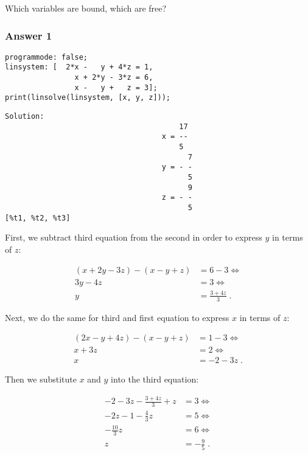 \documentclass[11pt]{article}
\begin{document}
Which variables are bound, which are free?

\subsubsection{Answer 1}
\label{sec:orgheadline1}

\begin{verbatim}
programmode: false;
linsystem: [  2*x -   y + 4*z = 1,
                x + 2*y - 3*z = 6,
                x -   y +   z = 3];
print(linsolve(linsystem, [x, y, z]));
\end{verbatim}

\begin{verbatim}
Solution:
                                        17
                                    x = --
                                        5
                                          7
                                    y = - -
                                          5
                                          9
                                    z = - -
                                          5
[%t1, %t2, %t3]
\end{verbatim}

First, we subtract third equation from the second in order to express \(y\) in
terms of \(z\):

\begin{align*}
(x + 2y - 3z) - (x - y + z) &= 6 - 3 \iff \\
                    3y - 4z &= 3 \iff \\
                          y &= \frac{3+4z}{3}\;.
\end{align*}

Next, we do the same for third and first equation to express \(x\) in terms of
\(z\):

\begin{align*}
(2x - y + 4z) - (x - y + z) &= 1 - 3 \iff \\
                    x + 3z &= 2 \iff \\
                          x &= -2 - 3z\;.
\end{align*}

Then we substitute \(x\) and \(y\) into the third equation:

\begin{align*}
-2 - 3z - \frac{3 + 4z}{3} + z &= 3 \iff \\
        -2z - 1 - \frac{4}{3}z &= 5 \iff \\
                -\frac{10}{3}z &= 6 \iff \\
                             z &= -\frac{9}{5}\;.
\end{align*}
\end{document}
